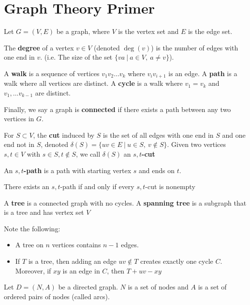 \documentclass[../main.tex]{subfiles}
\begin{document}
\section{Graph Theory Primer}
Let $G = (V, E)$ be a graph, where $V$ is the vertex set and $E$ is the edge set.
\begin{definition}{}{}
   The \textbf{degree} of a vertex $v \in V$ (denoted $\deg(v)$) is the number of edges with one end in $v$. (i.e. The size of the set $\{ va \:\rvert\: a \in V, \ a \neq v \}$).

   A \textbf{walk} is a sequence of vertices $v_1v_2\ldots v_k$ where $v_iv_{i+1}$ is an edge. A \textbf{path} is a walk where all vertices are distinct. A \textbf{cycle} is a walk where $v_1 = v_k$ and $v_1, \ldots v_{k-1}$ are distinct.

   Finally, we say a graph is \textbf{connected} if there exists a path between any two vertices in $G$.
\end{definition}

\begin{definition}{}{}
  For $S \subset V$, the \textbf{cut} induced by $S$ is the set of all edges with one end in $S$ and one end not in $S$, denoted $\delta(S) = \{uv \in E \:\rvert\: u \in S, \ v \not\in S \}$. Given two vertices $s, t \in V$ with $s \in S, t \not\in S$, we call $\delta(S)$ an \textbf{$s,t$-cut}

  An \textbf{$s,t$-path} is a path with starting vertex $s$ and ends on $t$.
\end{definition}

\begin{theorem}{}{}
  There exists an $s,t$-path if and only if every $s,t$-cut is nonempty
\end{theorem}

\begin{definition}{}{}
  A \textbf{tree} is a connected graph with no cycles. A \textbf{spanning tree} is a subgraph that is a tree and has vertex set $V$
\end{definition}
Note the following:
\begin{itemize}
  \item A tree on $n$ vertices contains $n-1$ edges.
  \item If $T$ is a tree, then adding an edge $uv \not\in T$ creates exactly one cycle $C$. Moreover, if $xy$ is an edge in $C$, then $T + uv - xy$
\end{itemize}

Let $D = (N, A)$ be a directed graph. $N$ is a set of nodes and $A$ is a set of ordered pairs of nodes (called arcs).
\end{document}
